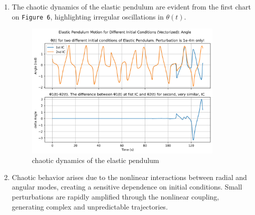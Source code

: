 \documentclass{article}
\begin{document}
	\begin{enumerate}
		\item The chaotic dynamics of the elastic pendulum are evident from the first chart on \texttt{Figure 6}, highlighting irregular oscillations in $\theta(t)$.
			\begin{figure}[h!]
				\centering
				\includegraphics[width=0.9\textwidth]{elastic_pendulum_theta.png}
				\caption{chaotic dynamics of the elastic pendulum}
			\end{figure}
		
		\item Chaotic behavior arises due to the nonlinear interactions between radial and angular modes, creating a sensitive dependence on initial conditions. Small perturbations are rapidly amplified through the nonlinear coupling, generating complex and unpredictable trajectories.
	\end{enumerate}
	
\end{document}
